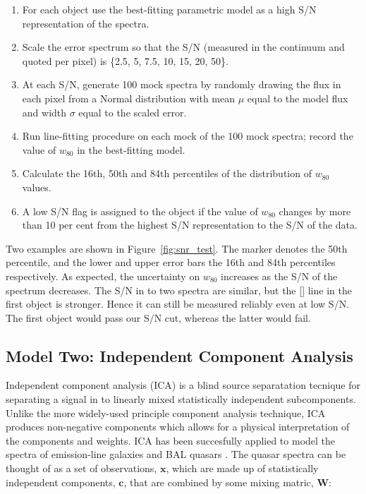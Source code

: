 \begin{enumerate}
\item For each object use the best-fitting parametric model as a high S/N representation of the spectra. 
\item Scale the error spectrum so that the S/N (measured in the continuum and quoted per pixel) is \{2.5, 5, 7.5, 10, 15, 20, 50\}.
\item At each S/N, generate 100 mock spectra by randomly drawing the flux in each pixel from a Normal distribution with mean $\mu$ equal to the model flux and width $\sigma$ equal to the scaled error. 
\item Run line-fitting procedure on each mock of the 100 mock spectra; record the value of $w_{80}$ in the best-fitting model. 
\item Calculate the 16th, 50th and 84th percentiles of the distribution of $w_{80}$ values.
\item A low S/N flag is assigned to the object if the value of $w_{80}$ changes by more than 10 per cent from the highest S/N representation to the S/N of the data. 
\end{enumerate}

Two examples are shown in Figure~\ref{fig:snr_test}.
The marker denotes the 50th percentile, and the lower and upper error bars the 16th and 84th percentiles respectively. 
As expected, the uncertainty on $w_{80}$ increases as the S/N of the spectrum decreases. 
The S/N in to two spectra are similar, but the [] line in the  first object is stronger. 
Hence it can still be measured reliably even at low S/N. 
The first object would pass our S/N cut, whereas the latter would fail. 

\subsection{Model Two: Independent Component Analysis}

Independent component analysis (ICA) is a blind source separatation tecnique for separating a signal in to linearly mixed statistically independent subcomponents. 
Unlike the more widely-used principle component analysis technique, ICA produces non-negative components which allows for a physical interpretation of the components and weights.  
ICA has been succesfully applied to model the spectra of emission-line galaxies \citep{allen13} and BAL quasars \citep{allen11}. 
The quasar spectra can be thought of as a set of observations, $\bm{x}$, which are made up of statistically independent components, $\bm{c}$, that are combined by some mixing matric, $\bm{W}$:

